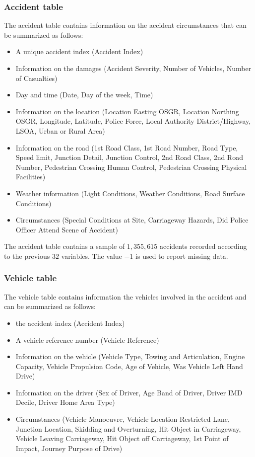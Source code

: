 \documentclass{article}
\begin{document}
\subsubsection{Accident table}
The accident table contains information on the accident circumstances that can be summarized as follows: 
\begin{itemize}
\item A unique accident index (Accident Index)
\item Information on the damages (Accident Severity, Number of Vehicles, Number of Casualties) 
\item Day and time (Date, Day of the week, Time) 
\item Information on the location (Location Easting OSGR, Location Northing OSGR, Longitude, Latitude, Police Force, Local Authority District/Highway, LSOA, Urban or Rural Area) 
\item Information on the road (1st Road Class, 1st Road Number, Road Type, Speed limit, Junction Detail, Junction Control, 2nd Road Class, 2nd Road Number, Pedestrian Crossing Human Control, Pedestrian Crossing Physical Facilities)
\item Weather information (Light Conditions, Weather Conditions, Road Surface Conditions)
\item Circumstances (Special Conditions at Site, Carriageway Hazards, Did Police Officer Attend Scene of Accident)
\end{itemize}

The accident table contains a sample of $1,355,615$ accidents recorded according to the previous $32$ variables. The value $-1$ is used to report missing data. 

\subsubsection{Vehicle table}
The vehicle table contains information the vehicles involved in the accident and can be summarized as follows: 
\begin{itemize}
\item the accident index (Accident Index)
\item A vehicle reference number (Vehicle Reference) 
\item Information on the vehicle (Vehicle Type, Towing and Articulation, Engine Capacity, Vehicle Propulsion Code, Age of Vehicle, Was Vehicle Left Hand Drive)
\item Information on the driver (Sex of Driver, Age Band of Driver, Driver IMD Decile, Driver Home Area Type) 
\item Circumstances (Vehicle Manoeuvre, Vehicle Location-Restricted Lane, Junction Location, Skidding and Overturning, Hit Object in Carriageway, Vehicle Leaving Carriageway, Hit Object off Carriageway, 1st Point of Impact, Journey Purpose of Drive)
\end{itemize}
\end{document}
